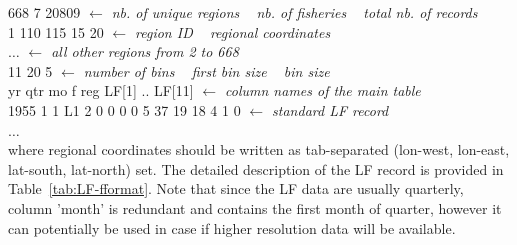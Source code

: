 \vspace{1cm}
{\ttfamily \noindent
  \hspace*{0.5cm} 668 \mbox{} 7 \mbox{} 20809}
 \hspace*{1.1cm}  \textit{{\color{blue}$\leftarrow$ nb. of unique regions \mbox{ } nb. of fisheries \mbox{ } total nb. of records}}\\
{\ttfamily  \hspace*{0.5cm} 1	110 115     15      20 }
 \hspace*{0.5cm}  \textit{{\color{blue}$\leftarrow$ region ID \mbox { } regional coordinates}}\\  
{\ttfamily  \hspace*{0.5cm} $\dots$}
\hspace*{3.4cm}  \textit{{\color{blue}$\leftarrow$ all other regions from 2 to 668}}\\
{\ttfamily  \hspace*{0.5cm} 11      20      5}
 \hspace*{2.5cm}  \textit{{\color{blue}$\leftarrow$ number of bins \mbox{ } first bin size \mbox{ } bin size}}\\    
{\ttfamily  \hspace*{0.5cm} yr      qtr     mo      f       reg     LF[1] .. LF[11]}
 \hspace*{1.5cm}  \textit{{\color{blue}$\leftarrow$ column names of the main table}}\\  
{\ttfamily  \hspace*{0.5cm} 1955    1       1       L1      2       0       0      0       0       5            37      19      18      4       1       0  }
 \hspace*{0.0cm}  \textit{{\color{blue}$\leftarrow$ standard LF record}}\\  
{\ttfamily  \hspace*{0.5cm} $\dots$ }\\

\noindent where regional coordinates should be written as tab-separated (lon-west, lon-east, lat-south, lat-north) set. The detailed description of the LF record is provided in Table~\ref{tab:LF-fformat}. Note that since the LF data are usually quarterly, column 'month' is redundant and contains the first month of quarter, however it can potentially be used in case if higher resolution data will be available. 

